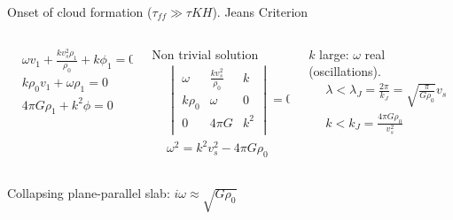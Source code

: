 \begin{frame}{Onset of cloud formation ($\tau_{ff}\gg\tau{KH}$). Jeans Criterion}
\begin{columns}[T]
	\begin{column}{0.3\textwidth}
		\begin{align*}
		&\omega v_1+\frac{kv_s^2\rho_1}{\rho_0}+k\phi_1=0\\
		&k\rho_0v_1+\omega\rho_1=0\\
		&4\pi G\rho_1+k^2\phi=0
		\end{align*}
	\end{column}
	\begin{column}{0.3\textwidth}
Non trivial solution
		\begin{align*}
		&\begin{vmatrix}
            \omega&\frac{kv_s^2}{\rho_0}&k\\
		k\rho_0&\omega&0\\
		0&4\pi G&k^2\\
		\end{vmatrix}=0\\
		&\omega^2=k^2v_s^2-4\pi G\rho_0
		\end{align*}
	\end{column}
	\begin{column}{0.4\textwidth}
$k$ large: $\omega$ real (oscillations). 
\begin{align*}
    &\lambda<\lambda_J=\frac{2\pi}{k_J}=\sqrt{\frac{\pi}{G\rho_0}}v_s\tag{Stable}\\
    &k<k_J=\frac{4\pi G\rho_0}{v_s^2}\tag{Unstable}
\end{align*}
\end{column}
\end{columns}
Collapsing plane-parallel slab: $i\omega\approx\sqrt{G\rho_0}$
\end{frame}

